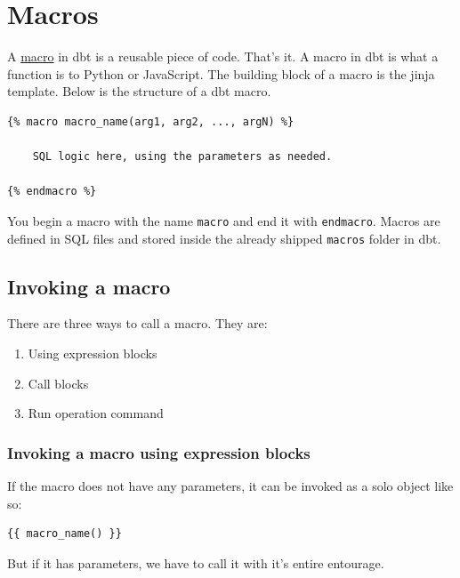 \documentclass[
]{book}
\begin{document}
\hypertarget{macros}{%
\chapter{Macros}\label{macros}}

A \href{https://www.phdata.io/blog/what-are-dbt-macros/?utm_source=pocket_saves}{macro} in dbt is a reusable piece of code. That's it. A macro in dbt is what a function is to Python or JavaScript. The building block of a macro is the jinja template. Below is the structure of a dbt macro.

\begin{verbatim}
{% macro macro_name(arg1, arg2, ..., argN) %}

    SQL logic here, using the parameters as needed.

{% endmacro %}
\end{verbatim}

You begin a macro with the name \texttt{macro} and end it with \texttt{endmacro}. Macros are defined in SQL files and stored inside the already shipped \texttt{macros} folder in dbt.

\hypertarget{invoking-a-macro}{%
\section{Invoking a macro}\label{invoking-a-macro}}

There are three ways to call a macro. They are:

\begin{enumerate}
\def\labelenumi{\arabic{enumi}.}
\item
  Using expression blocks
\item
  Call blocks
\item
  Run operation command
\end{enumerate}

\hypertarget{invoking-a-macro-using-expression-blocks}{%
\subsection{Invoking a macro using expression blocks}\label{invoking-a-macro-using-expression-blocks}}

If the macro does not have any parameters, it can be invoked as a solo object like so:

\begin{verbatim}
{{ macro_name() }}
\end{verbatim}

But if it has parameters, we have to call it with it's entire entourage.
\end{document}
